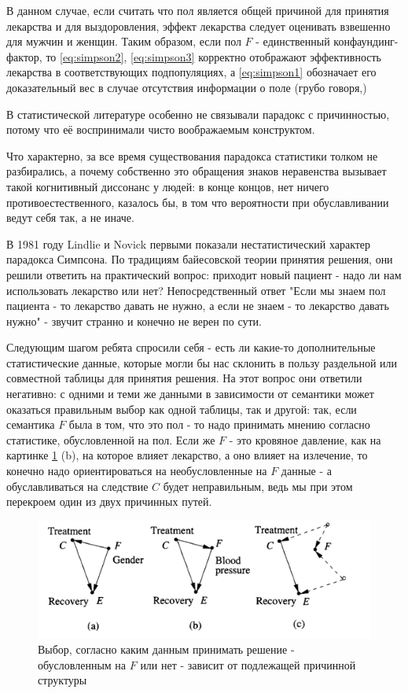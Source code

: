 \documentclass[fleqn]{article}
\numberwithin{equation}{section}
\numberwithin{theorem}{section}
\numberwithin{figure}{section}
\numberwithin{lemma}{section}
\numberwithin{corollary}{section}
\begin{document}
В данном случае, если считать что пол является общей причиной для принятия лекарства и для выздоровления, эффект лекарства следует оценивать взвешенно для мужчин и женщин. Таким образом, если пол $F$ - единственный конфаундинг-фактор, то \ref{eq:simpson2}, \ref{eq:simpson3} корректно отображают эффективность лекарства в соответствующих подпопуляциях, а \ref{eq:simpson1} обозначает его доказательный вес в случае отсутствия информации о поле (грубо говоря,)


 В статистической литературе особенно не связывали парадокс с причинностью, потому что её воспринимали чисто воображаемым конструктом. 
 
 Что характерно, за все время существования парадокса статистики толком не разбирались, а почему собственно это обращения знаков неравенства вызывает такой когнитивный диссонанс у людей: в конце концов, нет ничего противоестественного, казалось бы, в том что вероятности при обуславливании ведут себя так, а не иначе. 
 
В 1981 году Lindlie и Novick первыми показали нестатистический характер парадокса Симпсона. По традициям байесовской теории принятия решения, они решили ответить на практический вопрос: приходит новый пациент - надо ли нам использовать лекарство или нет? Непосредственный ответ "Если мы знаем пол пациента - то лекарство давать не нужно, а если не знаем - то лекарство давать нужно" - звучит странно и конечно не верен по сути. 

Следующим шагом ребята спросили себя - есть ли какие-то дополнительные статистические данные, которые могли бы нас склонить в пользу раздельной или совместной таблицы для принятия решения. На этот вопрос они ответили негативно: с одними и теми же данными в зависимости от семантики может оказаться правильным выбор как одной таблицы, так и другой: так, если семантика $F$ была в том, что это пол - то надо принимать мнению согласно статистике, обусловленной на пол. Если же $F$ - это кровяное давление, как на картинке \ref{fig:simpson2} (b), на которое влияет лекарство, а оно влияет на излечение, то конечно надо ориентироваться на необусловленные на $F$ данные - а обуславливаться на следствие $C$ будет неправильным, ведь мы при этом перекроем один из двух причинных путей.

\begin{figure}[h]
	\begin{center}
		\includegraphics[scale=0.6]{imgs/img29.png}
	\end{center}
	\caption{Выбор, согласно каким данным принимать решение - обусловленным на $F$ или нет - зависит от подлежащей причинной структуры}
	\label{fig:simpson2}
\end{figure}
\end{document}
